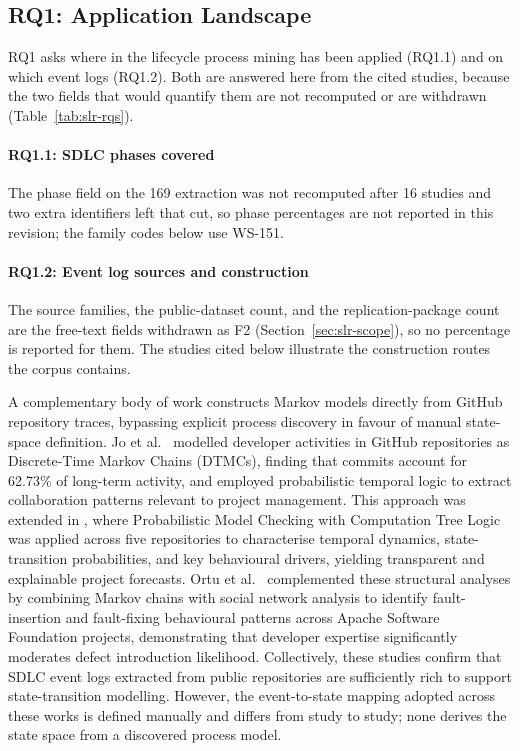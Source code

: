 \subsection{RQ1: Application Landscape}
\label{sec:slr-rq1}

RQ1 asks where in the lifecycle process mining has been applied (RQ1.1)
and on which event logs (RQ1.2). Both are answered here from the cited
studies, because the two fields that would quantify them are not
recomputed or are withdrawn (Table~\ref{tab:slr-rqs}).

\paragraph{RQ1.1: SDLC phases covered} The phase field on the 169 extraction was not recomputed after 16 studies
and two extra identifiers left that cut, so phase percentages are not
reported in this revision; the family codes below use WS-151.

\paragraph{RQ1.2: Event log sources and construction} The source families, the public-dataset count, and the replication-package
count are the free-text fields withdrawn as F2 (Section~\ref{sec:slr-scope}),
so no percentage is reported for them. The studies cited below illustrate
the construction routes the corpus contains.

A complementary body of work constructs Markov models directly from GitHub
repository traces, bypassing explicit process discovery in favour of manual
state-space definition. Jo et al.\ \cite{jo2023} modelled developer activities
in GitHub repositories as Discrete-Time Markov Chains (DTMCs), finding that
commits account for 62.73\% of long-term activity, and employed probabilistic
temporal logic to extract collaboration patterns relevant to project management.
This approach was extended in \cite{jo2024}, where Probabilistic Model Checking
with Computation Tree Logic was applied across five repositories to characterise
temporal dynamics, state-transition probabilities, and key behavioural drivers,
yielding transparent and explainable project forecasts. Ortu et al.\ \cite{ortu2023}
complemented these structural analyses by combining Markov chains with social
network analysis to identify fault-insertion and fault-fixing behavioural patterns
across Apache Software Foundation projects, demonstrating that developer expertise
significantly moderates defect introduction likelihood. Collectively, these studies
confirm that SDLC event logs extracted from public repositories are sufficiently
rich to support state-transition modelling. However, the event-to-state mapping
adopted across these works is defined manually and differs from study to study;
none derives the state space from a discovered process model.


